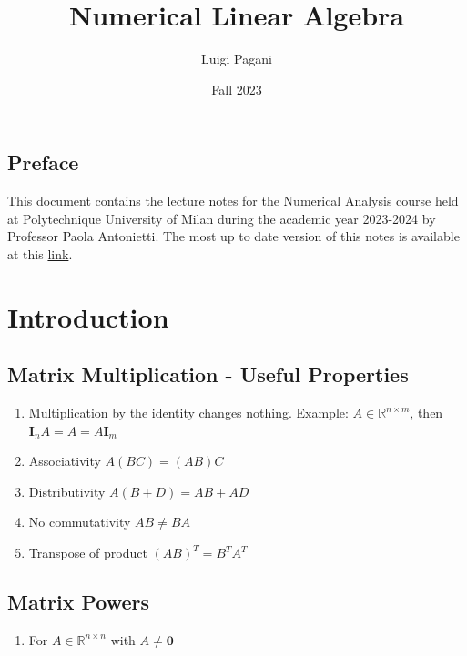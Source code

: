 \documentclass[11pt]{book}
\title{Numerical Linear Algebra }
\author{Luigi Pagani}
\date{Fall 2023}
\begin{document}
\maketitle
\vspace*{\fill}
\section*{Preface}
This document contains the lecture notes for the Numerical Analysis course held at Polytechnique University of Milan during the academic year 2023-2024 by Professor Paola Antonietti. 
The most up to date version of this notes is available at this \href{https://www.overleaf.com/read/wnkgdbzwhdtd}{link}.
\vspace*{\fill}

\newpage

\tableofcontents

\chapter{Introduction}
\section*{Matrix Multiplication - Useful Properties}
\begin{enumerate}
  \item Multiplication by the identity changes nothing. Example: $A \in \mathbb{R}^{n \times m}$, then $\mathbf{I}_{n} A=A=A \mathbf{I}_{m}$

  \item Associativity $A(B C)=(A B) C$

  \item Distributivity $A(B+D)=A B+A D$

  \item No commutativity $A B \neq B A$

  \item Transpose of product $(A B)^{T}=B^{T} A^{T}$

\end{enumerate}

\section*{Matrix Powers}
\begin{enumerate}
  \item For $A \in \mathbb{R}^{n \times n}$ with $A \neq \mathbf{0}$
\end{enumerate}
\end{document}
